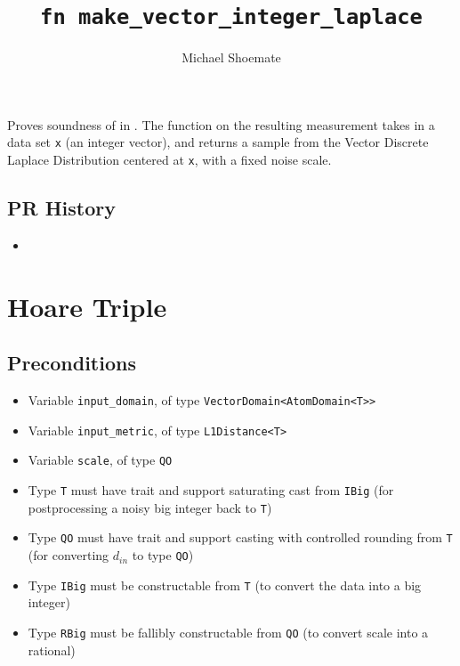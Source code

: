 \documentclass{article}
\title{\texttt{fn make\_vector\_integer\_laplace}}
\author{Michael Shoemate}
\begin{document}
\maketitle

\contrib

Proves soundness of  in .
The function on the resulting measurement takes in a data set \texttt{x} (an integer vector), 
and returns a sample from the Vector Discrete Laplace Distribution centered at \texttt{x}, with a fixed noise scale.

\subsection*{PR History}
\begin{itemize}
    \item {}
\end{itemize}

\section{Hoare Triple}

\subsection*{Preconditions}
\begin{itemize}
    \item Variable \texttt{input\_domain}, of type \texttt{VectorDomain<AtomDomain<T>>}
    \item Variable \texttt{input\_metric}, of type \texttt{L1Distance<T>}
    \item Variable \texttt{scale}, of type \texttt{QO}
    \item Type \texttt{T} must have trait  and support saturating cast from \texttt{IBig} (for postprocessing a noisy big integer back to \texttt{T})
    \item Type \texttt{QO} must have trait  and support casting with controlled rounding from \texttt{T} (for converting $d_{in}$ to type \texttt{QO})
    \item Type \texttt{IBig} must be constructable from \texttt{T} (to convert the data into a big integer)
    \item Type \texttt{RBig} must be fallibly constructable from \texttt{QO} (to convert scale into a rational)
\end{itemize}
\end{document}
